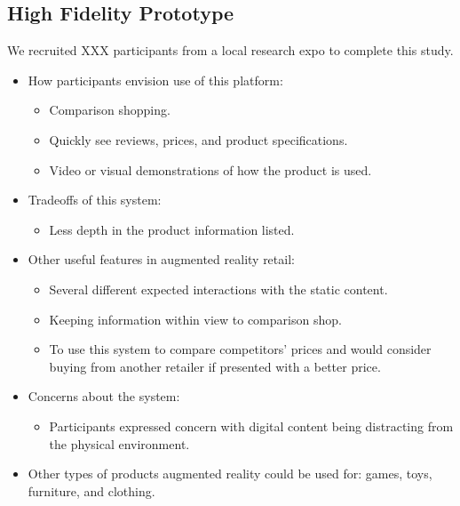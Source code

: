 \subsection{High Fidelity Prototype}
We recruited XXX participants from a local research expo to complete this study. 
\begin{itemize}
	\item How participants envision use of this platform:
	\begin{itemize} \compresslist%
		\item Comparison shopping.
		\item Quickly see reviews, prices, and product specifications.
		\item Video or visual demonstrations of how the product is used.
	\end{itemize}
	\item Tradeoffs of this system:
		\begin{itemize} \compresslist%
			\item Less depth in the product information listed.
		\end{itemize}
	\item Other useful features in augmented reality retail:
	\begin{itemize} \compresslist%
		\item Several different expected interactions with the static content.
		\item Keeping information within view to comparison shop.
		\item To use this system to compare competitors' prices and would consider buying from another retailer if presented with a better price.
	\end{itemize}
	\item Concerns about the system:
	\begin{itemize} \compresslist%
		\item Participants expressed concern with digital content being distracting from the physical environment.
	\end{itemize}
	\item Other types of products augmented reality could be used for: games, toys, furniture, and clothing.
\end{itemize}